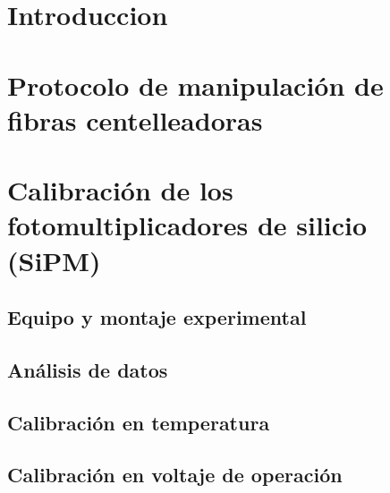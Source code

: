 \documentclass[11pt,a4paper]{article}
\begin{document}


\tableofcontents
\newpage


\section{Introduccion}  \label{sec:Introduccion}


\section{Protocolo de manipulación de fibras centelleadoras} \label{sec:Fibras}


\section{Calibración de los fotomultiplicadores de silicio (SiPM)} \label{sec:SiPM}

	\subsection{Equipo y montaje experimental}\label{sec:Equipo}
	
	
	
	\subsection{Análisis de datos}\label{sec:Analisis}
	
	
	\subsection{Calibración en temperatura}\label{sec:Temperatura}
	

	\subsection{Calibración en voltaje de operación}\label{sec:Voltaje}
	
	
\end{document}
